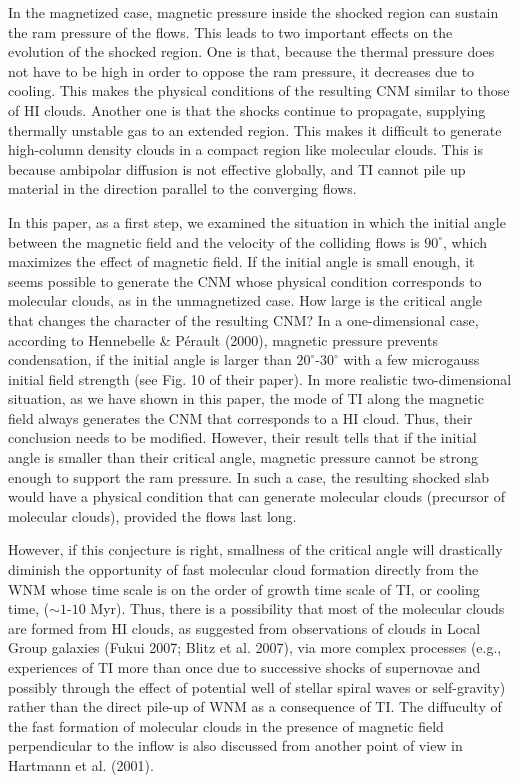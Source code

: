 \documentclass[12pt,preprint]{aastex}
\begin{document}
In the magnetized case, magnetic pressure inside the shocked region can sustain the ram pressure of the flows.
This leads to two important effects on the evolution of the shocked region.
One is that, because the thermal pressure does not have to be high in order to oppose the ram pressure, it decreases due to cooling.
This makes the physical conditions of the resulting CNM similar to those of HI clouds.
Another one is that the shocks continue to propagate, supplying thermally unstable gas to an extended region.
This makes it difficult to generate high-column density clouds in a compact region like molecular clouds.
This is because ambipolar diffusion is not effective globally, and TI cannot pile up material in the direction parallel to the converging flows.

In this paper, as a first step, we examined the situation in which the initial angle between the magnetic field and the velocity of the colliding flows is $90^\circ$, which maximizes the effect of magnetic field.
If the initial angle is small enough, it seems possible to generate the CNM whose physical condition corresponds to molecular clouds, as in the unmagnetized case.
How large is the critical angle that changes the character of the resulting CNM?
In a one-dimensional case, according to Hennebelle \& P\'erault (2000), magnetic pressure prevents condensation, if the initial angle is larger than $20^\circ$-$30^\circ$ with a few microgauss initial field strength (see Fig. 10 of their paper).
In more realistic two-dimensional situation, as we have shown in this paper, the mode of TI along the magnetic field always generates the CNM that corresponds to a HI cloud.
Thus, their conclusion needs to be modified.
However, their result tells that if the initial angle is smaller than their critical angle, magnetic pressure cannot be strong enough to support the ram pressure.
In such a case, the resulting shocked slab would have a physical condition that can generate molecular clouds (precursor of molecular clouds), provided the flows last long.

However, if this conjecture is right, smallness of the critical angle will drastically diminish the opportunity of fast molecular cloud formation directly from the WNM whose time scale is on the order of growth time scale of TI, or cooling time, ($\sim1$-$10$ Myr).
Thus, there is a possibility that most of the molecular clouds are formed from HI clouds, as suggested from observations of clouds in Local Group galaxies (Fukui 2007; Blitz et al. 2007), via more complex processes (e.g., experiences of TI more than once due to successive shocks of supernovae and possibly through the effect of potential well of stellar spiral waves or self-gravity) rather than the direct pile-up of WNM as a consequence of TI.
The diffuculty of the fast formation of molecular clouds in the presence of magnetic field perpendicular to the inflow is also discussed from another point of view in Hartmann et al. (2001).
\end{document}
